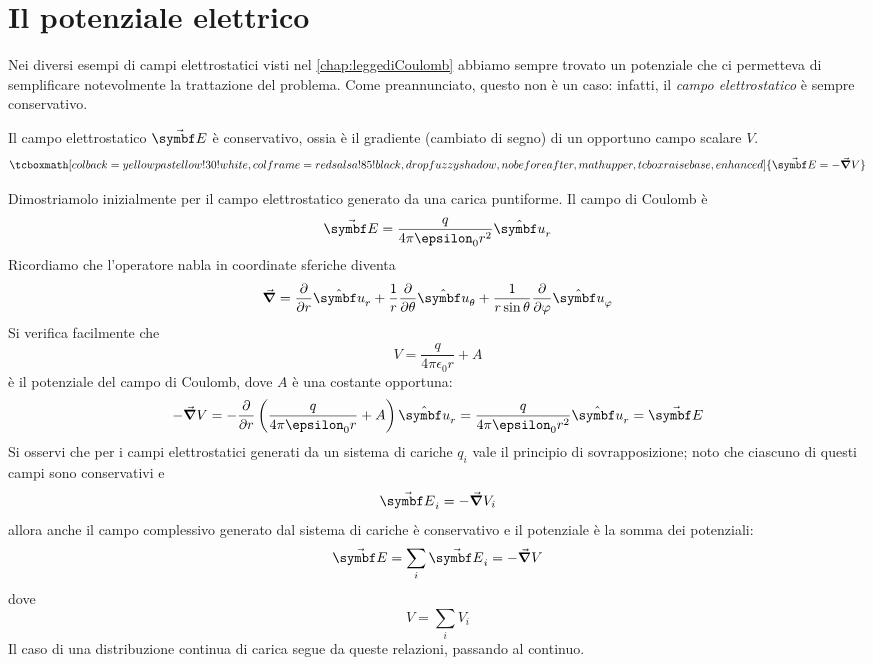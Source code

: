 \section{Il potenziale elettrico}
Nei diversi esempi di campi elettrostatici visti nel \autoref{chap:leggediCoulomb} abbiamo sempre trovato un potenziale che ci permetteva di semplificare notevolmente la trattazione del problema. Come preannunciato, questo non è un caso: infatti, il \textit{campo elettrostatico} è sempre conservativo.
\begin{theorema}
	Il campo elettrostatico $\vba{E}$ è conservativo, ossia è il gradiente (cambiato di segno) di un opportuno campo scalare $V$.
	\begin{equation}
		\tcboxmath[colback=yellowpastellow!30!white,colframe=redsalsa!85!black,drop fuzzy shadow, nobeforeafter, math upper, tcbox raise base, enhanced]{\vba{E}=-\grad{V}}
	\end{equation}
\end{theorema}
\begin{demonstration}
	Dimostriamolo inizialmente per il campo elettrostatico generato da una carica puntiforme.
	Il campo di Coulomb è 
\begin{equation*}
	\vba{E}=\frac{q}{4\pi\epsilon_0r^2}\vbh{u}_r
\end{equation*}
Ricordiamo che l'operatore nabla in coordinate sferiche diventa
\begin{equation*}
	\grad =\pdv{r}\vbh{u}_r+\frac{1}{r}\pdv{\theta}\vbh{u}_\theta+\frac{1}{r\sin\theta}\pdv{\phi}\vbh{u}_\phi
\end{equation*}
Si verifica facilmente che
\begin{equation}
	V=\frac{q}{4\pi\epsilon_0r}+A\label{PotenzialeConst}
\end{equation}
è il potenziale del campo di Coulomb, dove $A$ è una costante opportuna:
\begin{equation*}
	-\grad{V}=-\pdv{r}\left(\frac{q}{4\pi\epsilon_0r}+A\right)\vbh{u}_r=\frac{q}{4\pi\epsilon_0r^2}\vbh{u}_r=\vba{E}
\end{equation*}
Si osservi che per i campi elettrostatici generati da un sistema di cariche $q_i$ vale il principio di sovrapposizione; noto che ciascuno di questi campi sono conservativi e
\begin{equation*}
	\vba{E}_i=-\grad{V}_i
\end{equation*}
allora anche il campo complessivo generato dal sistema di cariche è conservativo e il potenziale è la somma dei potenziali:
\begin{equation}
	\vba{E}=\sum_i\vba{E}_i=-\grad{V}
\end{equation}
dove
\begin{equation}
	V=\sum_iV_i
\end{equation}
Il caso di una distribuzione continua di carica segue da queste relazioni, passando al continuo.
\end{demonstration}\label{CondizionialContornoPot}
